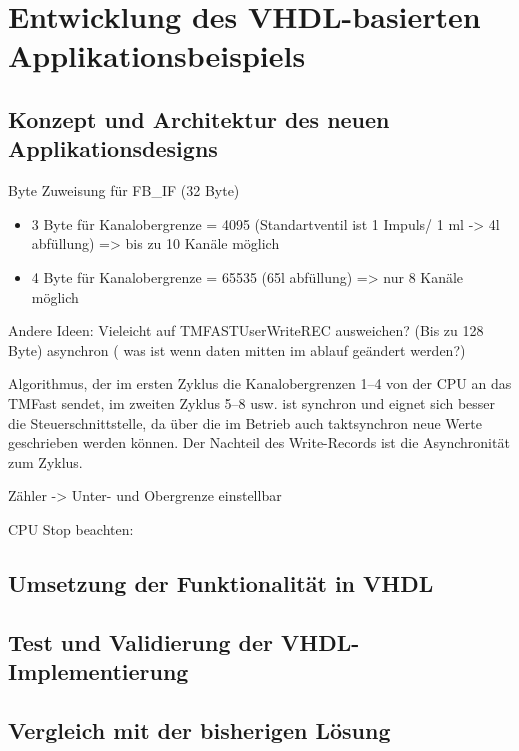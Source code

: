 \chapter{Entwicklung des VHDL-basierten Applikationsbeispiels}

\section{Konzept und Architektur des neuen Applikationsdesigns}

Byte Zuweisung für FB\_IF (32 Byte)
    \begin{itemize}
        \item 3 Byte für Kanalobergrenze = 4095 (Standartventil ist 1 Impuls/ 1 ml -> 4l abfüllung) => bis zu 10 Kanäle möglich
        \item 4 Byte für Kanalobergrenze = 65535 (65l abfüllung) => nur 8 Kanäle möglich
    \end{itemize}

Andere Ideen:
Vieleicht auf TMFASTUserWriteREC ausweichen? (Bis zu 128 Byte)
asynchron ( was ist wenn daten mitten im ablauf geändert werden?)

Algorithmus, der im ersten Zyklus die Kanalobergrenzen 1–4 von der CPU an das TMFast sendet, im zweiten Zyklus 5–8 usw.
ist synchron und eignet sich besser
die Steuerschnittstelle, da über die im Betrieb auch taktsynchron neue Werte geschrieben werden können. Der Nachteil des Write-Records ist die Asynchronität zum Zyklus.


Zähler -> Unter- und Obergrenze einstellbar

CPU Stop beachten:

\section{Umsetzung der Funktionalität in VHDL}
\section{Test und Validierung der VHDL-Implementierung}
\section{Vergleich mit der bisherigen Lösung}